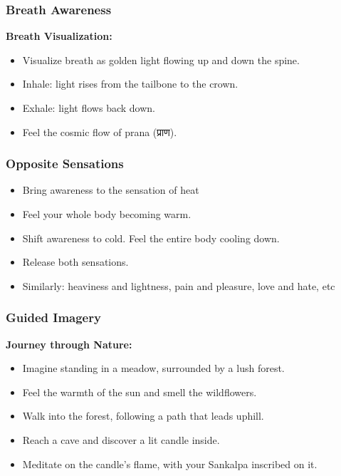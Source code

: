 \begin{frame}[fragile]\frametitle{Breath Awareness}
    \textbf{Breath Visualization:}
    \begin{itemize}
        \item Visualize breath as golden light flowing up and down the spine.
        \item Inhale: light rises from the tailbone to the crown.
        \item Exhale: light flows back down.
        \item Feel the cosmic flow of prana (प्राण).
    \end{itemize}
\end{frame}

\begin{frame}[fragile]\frametitle{Opposite Sensations}
    \begin{itemize}
        \item Bring awareness to the sensation of heat
        \item Feel your whole body becoming warm.
        \item Shift awareness to cold. Feel the entire body cooling down.
        \item Release both sensations.
		\item Similarly: heaviness and lightness, pain and pleasure, love and hate, etc
    \end{itemize}
\end{frame}

\begin{frame}[fragile]\frametitle{Guided Imagery}
    \textbf{Journey through Nature:}
    \begin{itemize}
        \item Imagine standing in a meadow, surrounded by a lush forest.
        \item Feel the warmth of the sun and smell the wildflowers.
        \item Walk into the forest, following a path that leads uphill.
        \item Reach a cave and discover a lit candle inside.
        \item Meditate on the candle's flame, with your Sankalpa inscribed on it.
    \end{itemize}
\end{frame}

